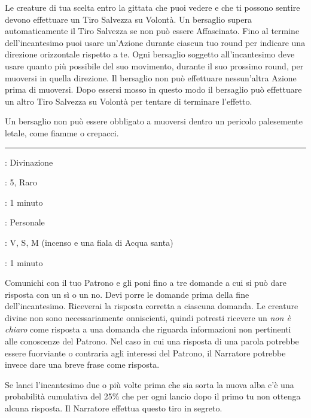 \begin{multicols}{2}
Le creature di tua scelta entro la gittata che puoi vedere e che ti possono sentire devono effettuare un Tiro Salvezza su Volontà. Un bersaglio supera automaticamente il Tiro Salvezza se non può essere Affascinato. Fino al termine dell'incantesimo puoi usare un'Azione durante ciascun tuo round per indicare una direzione orizzontale rispetto a te. Ogni bersaglio soggetto all'incantesimo deve usare quanto più possibile del suo movimento, durante il suo prossimo round, per muoversi in quella direzione. Il bersaglio non può effettuare nessun'altra Azione prima di muoversi. Dopo essersi mosso in questo modo il bersaglio può effettuare un altro Tiro Salvezza su Volontà per tentare di terminare l'effetto.

Un bersaglio non può essere obbligato a muoversi dentro un pericolo palesemente letale, come fiamme o crepacci.

\smallskip\noindent\rule{\linewidth}{2pt} \hypertarget{Comunione}{}\smallskip{}
\noindent
\begin{description}[noitemsep, topsep=0pt, parsep=0pt, partopsep=0pt, leftmargin=0cm, labelwidth=2.8cm]
	\item[\textbf{Lista di Magia}]: Divinazione
	\item[\textbf{Livello}]: 5, Raro
	\item[\textbf{T. di Lancio}]: 1 minuto
	\item[\textbf{Gittata}]: Personale
	\item[\textbf{Componenti}]: V, S, M (incenso e una fiala di Acqua santa)
	\item[\textbf{Durata}]: 1 minuto
\end{description}

Comunichi con il tuo Patrono e gli poni fino a tre domande a cui si può dare risposta con un sì o un no. Devi porre le domande prima della fine dell'incantesimo. Riceverai la risposta corretta a ciascuna domanda. Le creature divine non sono necessariamente onniscienti, quindi potresti ricevere un \emph{non è chiaro} come risposta a una domanda che riguarda informazioni non pertinenti alle conoscenze del Patrono. Nel caso in cui una risposta di una parola potrebbe essere fuorviante o contraria agli interessi del Patrono, il Narratore potrebbe invece dare una breve frase come risposta.

Se lanci l'incantesimo due o più volte prima che sia sorta la nuova alba c'è una probabilità cumulativa del 25\% che per ogni lancio dopo il primo tu non ottenga alcuna risposta. Il Narratore effettua questo tiro in segreto.


\end{multicols}
